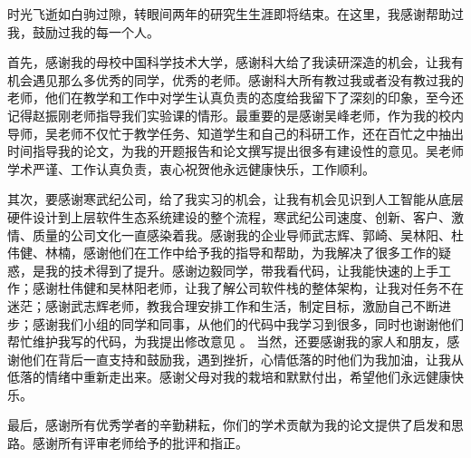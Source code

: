 
\begin{acknowledgements}
时光飞逝如白驹过隙，转眼间两年的研究生生涯即将结束。在这里，我感谢帮助过我，鼓励过我的每一个人。

首先，感谢我的母校中国科学技术大学，感谢科大给了我读研深造的机会，让我有机会遇见那么多优秀的同学，优秀的老师。感谢科大所有教过我或者没有教过我的老师，他们在教学和工作中对学生认真负责的态度给我留下了深刻的印象，至今还记得赵振刚老师指导我们实验课的情形。最重要的是感谢吴峰老师，作为我的校内导师，吴老师不仅忙于教学任务、知道学生和自己的科研工作，还在百忙之中抽出时间指导我的论文，为我的开题报告和论文撰写提出很多有建设性的意见。吴老师学术严谨、工作认真负责，衷心祝贺他永远健康快乐，工作顺利。

其次，要感谢寒武纪公司，给了我实习的机会，让我有机会见识到人工智能从底层硬件设计到上层软件生态系统建设的整个流程，寒武纪公司速度、创新、客户、激情、质量的公司文化一直感染着我。感谢我的企业导师武志辉、郭崎、吴林阳、杜伟健、林楠，感谢他们在工作中给予我的指导和帮助，为我解决了很多工作的疑惑，是我的技术得到了提升。感谢边毅同学，带我看代码，让我能快速的上手工作；感谢杜伟健和吴林阳老师，让我了解公司软件栈的整体架构，让我对任务不在迷茫；感谢武志辉老师，教我合理安排工作和生活，制定目标，激励自己不断进步；感谢我们小组的同学和同事，从他们的代码中我学习到很多，同时也谢谢他们帮忙维护我写的代码，为我提出修改意见
。
当然，还要感谢我的家人和朋友，感谢他们在背后一直支持和鼓励我，遇到挫折，心情低落的时他们为我加油，让我从低落的情绪中重新走出来。感谢父母对我的栽培和默默付出，希望他们永远健康快乐。

最后，感谢所有优秀学者的辛勤耕耘，你们的学术贡献为我的论文提供了启发和思路。感谢所有评审老师给予的批评和指正。

\end{acknowledgements}
